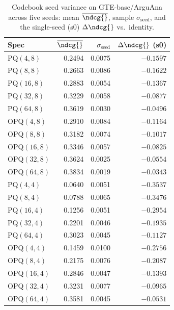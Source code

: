 \begin{table}[t]
\centering
\small
\caption{Codebook seed variance on GTE-base/ArguAna across five seeds: mean $\overline{\ndcg{}}$, sample $\sigma_{\text{seed}}$, and the single-seed (s0) $\Delta\ndcg{}$ vs.\ identity.}
\label{tab:seed-variance-gte-base-arguana}
\begin{tabular}{lrrr}
\toprule
Spec & $\overline{\ndcg{}}$ & $\sigma_{\text{seed}}$ & $\Delta\ndcg{}$ (s0) \\
\midrule
PQ$(4,8)$ & 0.2494 & 0.0075 & $-0.1597$ \\
PQ$(8,8)$ & 0.2663 & 0.0086 & $-0.1622$ \\
PQ$(16,8)$ & 0.2883 & 0.0054 & $-0.1367$ \\
PQ$(32,8)$ & 0.3229 & 0.0058 & $-0.0877$ \\
PQ$(64,8)$ & 0.3619 & 0.0030 & $-0.0496$ \\
OPQ$(4,8)$ & 0.2910 & 0.0084 & $-0.1164$ \\
OPQ$(8,8)$ & 0.3182 & 0.0074 & $-0.1017$ \\
OPQ$(16,8)$ & 0.3346 & 0.0057 & $-0.0825$ \\
OPQ$(32,8)$ & 0.3624 & 0.0025 & $-0.0554$ \\
OPQ$(64,8)$ & 0.3834 & 0.0019 & $-0.0343$ \\
PQ$(4,4)$ & 0.0640 & 0.0051 & $-0.3537$ \\
PQ$(8,4)$ & 0.0788 & 0.0065 & $-0.3476$ \\
PQ$(16,4)$ & 0.1256 & 0.0051 & $-0.2954$ \\
PQ$(32,4)$ & 0.2201 & 0.0046 & $-0.1935$ \\
PQ$(64,4)$ & 0.3023 & 0.0045 & $-0.1127$ \\
OPQ$(4,4)$ & 0.1459 & 0.0100 & $-0.2756$ \\
OPQ$(8,4)$ & 0.2175 & 0.0076 & $-0.2087$ \\
OPQ$(16,4)$ & 0.2846 & 0.0047 & $-0.1393$ \\
OPQ$(32,4)$ & 0.3231 & 0.0077 & $-0.0965$ \\
OPQ$(64,4)$ & 0.3581 & 0.0045 & $-0.0531$ \\
\bottomrule
\end{tabular}
\end{table}

